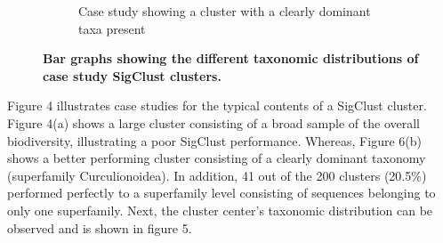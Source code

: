 \documentclass[12pt]{article}
\begin{document}
\begin{figure}[H]
\begin{subfigure}{0.486\textwidth}
      \caption{Case study showing a cluster with a clearly dominant taxa present}
    \end{subfigure}
    \captionsetup{margin=0.75cm}
      \caption{\textbf{\small Bar graphs showing the different taxonomic distributions of case study SigClust clusters.}}
  \end{figure}

  Figure 4 illustrates case studies for the typical contents of a SigClust cluster. Figure 4(a) shows a large cluster consisting of a broad sample of the overall biodiversity, illustrating a poor SigClust performance. Whereas, Figure 6(b) shows a better performing cluster consisting of a clearly dominant taxonomy (superfamily Curculionoidea). In addition, 41 out of the 200 clusters (20.5\%) performed perfectly to a superfamily level consisting of sequences belonging to only one superfamily. Next, the cluster center's taxonomic distribution can be observed and is shown in figure 5. 
\end{document}
